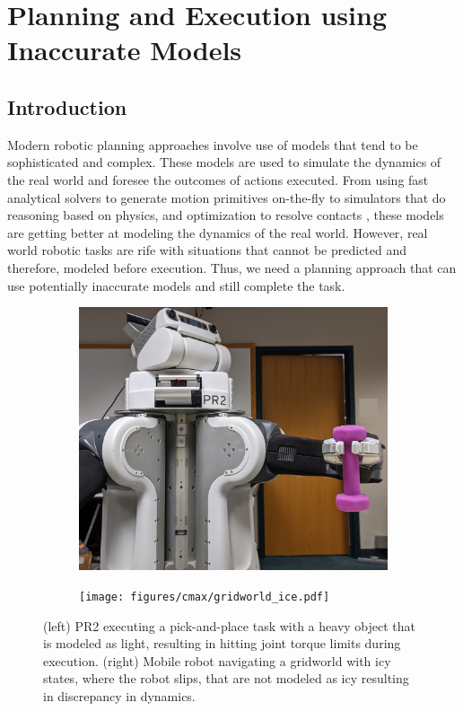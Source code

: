 \chapter{Planning and Execution using Inaccurate Models}
\label{cha:plann-exec}

\section{Introduction}
\label{sec:introduction}

Modern robotic planning approaches involve use of models that tend to
be sophisticated and complex. These models are used to simulate the
dynamics of the real world and foresee the outcomes of actions
executed. From using fast analytical solvers to generate motion
primitives on-the-fly \cite{DBLP:conf/icra/CohenSCL11} to 
simulators that do reasoning based on physics, and optimization to resolve
contacts \cite{DBLP:conf/iros/TodorovET12}, these models are getting better at
modeling the dynamics of the real world. However, real world robotic
tasks are rife with situations that cannot be predicted and therefore,
modeled before execution. Thus, we need a
planning approach that can use potentially inaccurate models and still
complete the task.

\begin{figure}[t]
  \centering
  \begin{subfigure}{.5\columnwidth}
    \includegraphics[width=\linewidth]{figures/cmax/pr2_dumbbell_full.jpg}
  \end{subfigure}
  \begin{subfigure}{.4\columnwidth}
    \texttt{[image: figures/cmax/gridworld\_ice.pdf]}
  \end{subfigure}  
  \caption{(left) PR2 executing a pick-and-place task with a heavy
    object that is modeled as light, resulting in hitting joint torque
    limits during execution. (right) Mobile
    robot navigating a gridworld with icy states, where the robot slips, that are not modeled
    as icy resulting in discrepancy in dynamics.}
  \label{fig:intro}
  
\end{figure}

